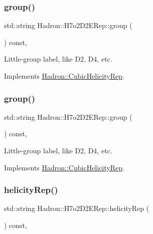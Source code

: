 \subsubsection{\texorpdfstring{group()}{group()}\hspace{0.1cm}{\footnotesize\ttfamily [2/3]}}
{\footnotesize\ttfamily std\+::string Hadron\+::\+H7o2\+D2\+E\+Rep\+::group (\begin{DoxyParamCaption}{ }\end{DoxyParamCaption}) const\hspace{0.3cm}{\ttfamily [inline]}, {\ttfamily [virtual]}}

Little-\/group label, like D2, D4, etc. 

Implements \mbox{\hyperlink{structHadron_1_1CubicHelicityRep_a101a7d76cd8ccdad0f272db44b766113}{Hadron\+::\+Cubic\+Helicity\+Rep}}.

\mbox{\label{structHadron_1_1H7o2D2ERep_a01d61c7d2d2ee0a909d40c5d43a90e09}} 
\subsubsection{\texorpdfstring{group()}{group()}\hspace{0.1cm}{\footnotesize\ttfamily [3/3]}}
{\footnotesize\ttfamily std\+::string Hadron\+::\+H7o2\+D2\+E\+Rep\+::group (\begin{DoxyParamCaption}{ }\end{DoxyParamCaption}) const\hspace{0.3cm}{\ttfamily [inline]}, {\ttfamily [virtual]}}

Little-\/group label, like D2, D4, etc. 

Implements \mbox{\hyperlink{structHadron_1_1CubicHelicityRep_a101a7d76cd8ccdad0f272db44b766113}{Hadron\+::\+Cubic\+Helicity\+Rep}}.

\mbox{\label{structHadron_1_1H7o2D2ERep_aa655a9ecae0dbff853de4c341c5da210}} 
\subsubsection{\texorpdfstring{helicityRep()}{helicityRep()}\hspace{0.1cm}{\footnotesize\ttfamily [1/2]}}
{\footnotesize\ttfamily std\+::string Hadron\+::\+H7o2\+D2\+E\+Rep\+::helicity\+Rep (\begin{DoxyParamCaption}{ }\end{DoxyParamCaption}) const\hspace{0.3cm}{\ttfamily [inline]}, {\ttfamily [virtual]}}

